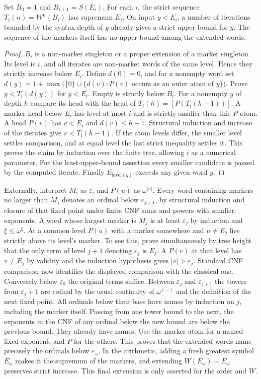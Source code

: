 \begin{theorem}
Set $B_0=1$ and $B_{i+1}=S(E_i)$. For each $i$, the strict sequence $T_i(n)=W^n(B_i)$ has supremum $E_i$. On input $y<E_i$, a number of iterations bounded by the syntax depth of $y$ already gives a strict upper bound for $y$. The sequence of the markers itself has no upper bound among the extended words.
\end{theorem}
\begin{proof}
$B_i$ is a non-marker singleton or a proper extension of a marker singleton. Its level is $i$, and all iterates are non-marker words of the same level. Hence they strictly increase below $E_i$. Define $d(0)=0$, and for a nonempty word set $d(y)=1+\max\big(\{0\}\cup\{d(v):P(v)\text{ occurs as an outer atom of }y\}\big)$. Prove $y<T_i(d(y))$ for $y<E_i$. Empty is strictly below $B_i$. For a nonempty $y$ of depth $h$ compare its head with the head of $T_i(h)=[P(T_i(h-1))]$. A marker head below $E_i$ has level at most $i$ and is strictly smaller than this $P$ atom. A head $P(v)$ has $v<E_i$ and $d(v)\le h-1$. Structural induction and increase of the iterates give $v<T_i(h-1)$. If the atom levels differ, the smaller level settles comparison, and at equal level the last strict inequality settles it. This proves the claim by induction over the finite tree, allowing $i$ as a numerical parameter. For the least-upper-bound assertion every smaller candidate is passed by the computed iterate. Finally $E_{\mathrm{level}(y)}$ exceeds any given word $y$.
\end{proof}
Externally, interpret $M_i$ as $\varepsilon_i$ and $P(u)$ as $\omega^{|u|}$. Every word containing markers no larger than $M_j$ denotes an ordinal below $\varepsilon_{j+1}$, by structural induction and closure of that fixed point under finite CNF sums and powers with smaller exponents. A word whose largest marker is $M_j$ is at least $\varepsilon_j$ by induction and $\xi\le\omega^\xi$. At a common level $P(u)$ with a marker somewhere and $u\ne E_j$ lies strictly above its level's marker. To see this, prove simultaneously by tree height that the only term of level $j+1$ denoting $\varepsilon_j$ is $E_j$. A $P(v)$ at that level has $v\ne E_j$ by validity and the induction hypothesis gives $|v|>\varepsilon_j$. Standard CNF comparison now identifies the displayed comparison with the classical one. Conversely below $\varepsilon_0$ the original terms suffice. Between $\varepsilon_j$ and $\varepsilon_{j+1}$ the towers from $\varepsilon_j+1$ are cofinal by the usual continuity of $\omega^{(-)}$ and the definition of the next fixed point. All ordinals below their base have names by induction on $j$, including the marker itself. Passing from one tower bound to the next, the exponents in the CNF of any ordinal below the new bound are below the previous bound. They already have names. Use the marker atom for a named fixed exponent, and $P$ for the others. This proves that the extended words name precisely the ordinals below $\varepsilon_\omega$. In the arithmetic, adding a fresh greatest symbol $E_\omega$ makes it the supremum of the markers, and extending $W(E_\omega)=E_\omega$ preserves strict increase. This final extension is only asserted for the order and $W$.
